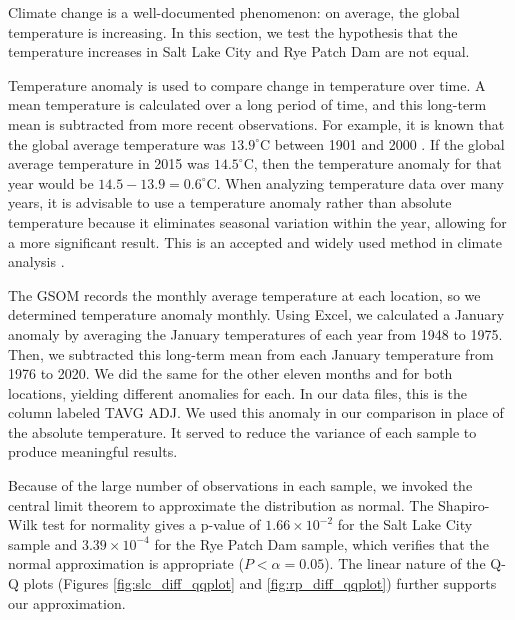 Climate change is a well-documented phenomenon: on average, the global temperature is increasing. In this section, we test the hypothesis that the temperature increases in Salt Lake City and Rye Patch Dam are not equal.

Temperature anomaly is used to compare change in temperature over time. A mean temperature is calculated over a long period of time, and this long-term mean is subtracted from more recent observations. For example, it is known that the global average temperature was $13.9^{\circ}$C between 1901 and 2000 \cite{noaa_temp_anomalies}. If the global average temperature in 2015 was $14.5^{\circ}$C, then the temperature anomaly for that year would be $14.5 - 13.9 = 0.6^{\circ}$C. When analyzing temperature data over many years, it is advisable to use a temperature anomaly rather than absolute temperature because it eliminates seasonal variation within the year, allowing for a more significant result. This is an accepted and widely used method in climate analysis \cite{temp_anomaly}.

The GSOM records the monthly average temperature at each location, so we determined temperature anomaly monthly. Using Excel, we calculated a January anomaly by averaging the January temperatures of each year from 1948 to 1975. Then, we subtracted this long-term mean from each January temperature from 1976 to 2020. We did the same for the other eleven months and for both locations, yielding different anomalies for each. In our data files, this is the column labeled TAVG ADJ. We used this anomaly in our comparison in place of the absolute temperature. It served to reduce the variance of each sample to produce meaningful results.

Because of the large number of observations in each sample, we invoked the central limit theorem to approximate the distribution as normal. The Shapiro-Wilk test for normality gives a p-value of $1.66\times 10^{-2}$ for the Salt Lake City sample and $3.39\times 10^{-4}$ for the Rye Patch Dam sample, which verifies that the normal approximation is appropriate ($P < \alpha = 0.05$). The linear nature of the Q-Q plots (Figures \ref{fig:slc_diff_qqplot} and \ref{fig:rp_diff_qqplot}) further supports our approximation.

